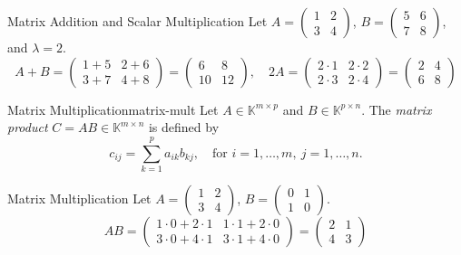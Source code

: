 \begin{example}{Matrix Addition and Scalar Multiplication}{}
    Let \(A = \begin{pmatrix}1 & 2\\3 & 4\end{pmatrix}\), \(B = \begin{pmatrix}5 & 6\\7 & 8\end{pmatrix}\), and \(\lambda = 2\).
    \[
        A+B = \begin{pmatrix}1+5 & 2+6\\3+7 & 4+8\end{pmatrix} = \begin{pmatrix}6 & 8\\10 & 12\end{pmatrix},\quad
        2A =
        \begin{pmatrix}
            2\cdot1 & 2\cdot2 \\
            2\cdot3 & 2\cdot4
        \end{pmatrix}
        =
        \begin{pmatrix}
            2 & 4 \\
            6 & 8
        \end{pmatrix}
    \]
\end{example}

\begin{definition}{Matrix Multiplication}{matrix-mult}
    Let \(A \in \mathbb{K}^{m \times p}\) and \(B \in \mathbb{K}^{p \times n}\). The \emph{matrix product} \(C = AB \in \mathbb{K}^{m \times n}\) is defined by
    \[
        c_{ij} = \sum_{k=1}^p a_{ik} b_{kj}, \quad \text{for } i=1,\ldots,m,\ j=1,\ldots,n.
    \]
\end{definition}

\begin{example}{Matrix Multiplication}{}
    Let \(A = \begin{pmatrix}1 & 2\\3 & 4\end{pmatrix}\), \(B = \begin{pmatrix}0 & 1\\1 & 0\end{pmatrix}\).
    \[
        AB = \begin{pmatrix}
            1\cdot0 + 2\cdot1 & 1\cdot1 + 2\cdot0 \\
            3\cdot0 + 4\cdot1 & 3\cdot1 + 4\cdot0
        \end{pmatrix}
        = \begin{pmatrix}2 & 1\\4 & 3\end{pmatrix}
    \]
\end{example}

